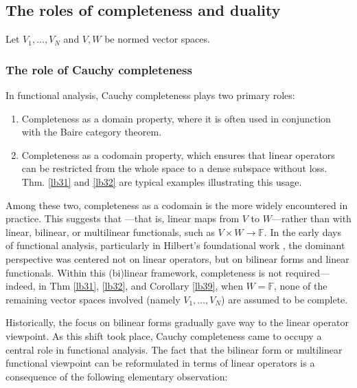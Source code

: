 \documentclass[12pt,b5paper,notitlepage]{article}
\theoremstyle{definition}
\theoremstyle{plain}
\newcommand{\Fbb}{\mathbb F}
\numberwithin{equation}{section}
\begin{document}
\subsection{The roles of completeness and duality}\label{lb43}

Let $V_1,\dots,V_N$ and $V,W$ be normed vector spaces.


\subsubsection{The role of Cauchy completeness}\label{lb141}



In functional analysis, Cauchy completeness plays two primary roles:
\begin{enumerate}
\item Completeness as a domain property, where it is often used in conjunction with the Baire category theorem.
\item Completeness as a codomain property, which ensures that linear operators can be restricted from the whole space to a dense subspace without loss. Thm. \ref{lb31} and \ref{lb32} are typical examples illustrating this usage.
\end{enumerate}



Among these two, completeness as a codomain is the more widely encountered in practice. This suggests that ---that is, linear maps from $V$ to $W$---rather than with linear, bilinear, or multilinear functionals, such as $V\times W\rightarrow\Fbb$. In the early days of functional analysis, particularly in Hilbert’s foundational work \cite{Hil06}, the dominant perspective was centered not on linear operators, but on bilinear forms and linear functionals. Within this (bi)linear framework, completeness is not required---indeed, in Thm \ref{lb31}, \ref{lb32}, and Corollary \ref{lb39}, when $W=\Fbb$, none of the remaining vector spaces involved (namely $V_1,\dots,V_N$) are assumed to be complete.


Historically, the focus on bilinear forms gradually gave way to the linear operator viewpoint. As this shift took place, Cauchy completeness came to occupy a central role in functional analysis. The fact that the bilinear form or multilinear functional viewpoint can be reformulated in terms of linear operators is a consequence of the following elementary observation:
\end{document}
